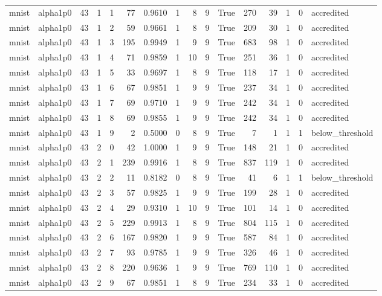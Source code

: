 \begin{tabular}{llrrrrrrrrrrrrrl}
mnist & alpha1p0 & 43 & 1 & 1 & 77 & 0.9610 & 1 & 8 & 9 & True & 270 & 39 & 1 & 0 & accredited \\
mnist & alpha1p0 & 43 & 1 & 2 & 59 & 0.9661 & 1 & 8 & 9 & True & 209 & 30 & 1 & 0 & accredited \\
mnist & alpha1p0 & 43 & 1 & 3 & 195 & 0.9949 & 1 & 9 & 9 & True & 683 & 98 & 1 & 0 & accredited \\
mnist & alpha1p0 & 43 & 1 & 4 & 71 & 0.9859 & 1 & 10 & 9 & True & 251 & 36 & 1 & 0 & accredited \\
mnist & alpha1p0 & 43 & 1 & 5 & 33 & 0.9697 & 1 & 8 & 9 & True & 118 & 17 & 1 & 0 & accredited \\
mnist & alpha1p0 & 43 & 1 & 6 & 67 & 0.9851 & 1 & 9 & 9 & True & 237 & 34 & 1 & 0 & accredited \\
mnist & alpha1p0 & 43 & 1 & 7 & 69 & 0.9710 & 1 & 9 & 9 & True & 242 & 34 & 1 & 0 & accredited \\
mnist & alpha1p0 & 43 & 1 & 8 & 69 & 0.9855 & 1 & 9 & 9 & True & 242 & 34 & 1 & 0 & accredited \\
mnist & alpha1p0 & 43 & 1 & 9 & 2 & 0.5000 & 0 & 8 & 9 & True & 7 & 1 & 1 & 1 & below\_threshold \\
mnist & alpha1p0 & 43 & 2 & 0 & 42 & 1.0000 & 1 & 9 & 9 & True & 148 & 21 & 1 & 0 & accredited \\
mnist & alpha1p0 & 43 & 2 & 1 & 239 & 0.9916 & 1 & 8 & 9 & True & 837 & 119 & 1 & 0 & accredited \\
mnist & alpha1p0 & 43 & 2 & 2 & 11 & 0.8182 & 0 & 8 & 9 & True & 41 & 6 & 1 & 1 & below\_threshold \\
mnist & alpha1p0 & 43 & 2 & 3 & 57 & 0.9825 & 1 & 9 & 9 & True & 199 & 28 & 1 & 0 & accredited \\
mnist & alpha1p0 & 43 & 2 & 4 & 29 & 0.9310 & 1 & 10 & 9 & True & 101 & 14 & 1 & 0 & accredited \\
mnist & alpha1p0 & 43 & 2 & 5 & 229 & 0.9913 & 1 & 8 & 9 & True & 804 & 115 & 1 & 0 & accredited \\
mnist & alpha1p0 & 43 & 2 & 6 & 167 & 0.9820 & 1 & 9 & 9 & True & 587 & 84 & 1 & 0 & accredited \\
mnist & alpha1p0 & 43 & 2 & 7 & 93 & 0.9785 & 1 & 9 & 9 & True & 326 & 46 & 1 & 0 & accredited \\
mnist & alpha1p0 & 43 & 2 & 8 & 220 & 0.9636 & 1 & 9 & 9 & True & 769 & 110 & 1 & 0 & accredited \\
mnist & alpha1p0 & 43 & 2 & 9 & 67 & 0.9851 & 1 & 8 & 9 & True & 234 & 33 & 1 & 0 & accredited \\

\end{tabular}
